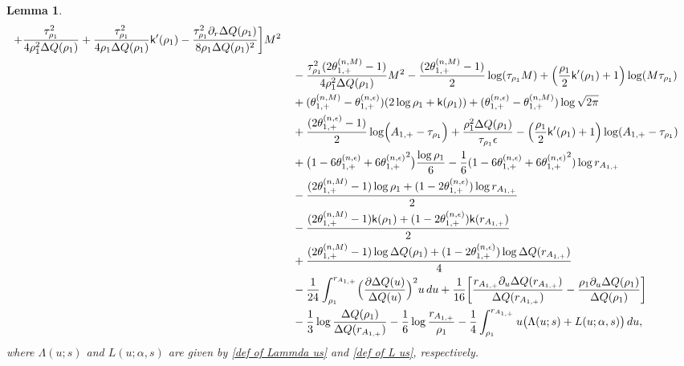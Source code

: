 \documentclass[a4paper]{article}
\newtheorem{lemma}[theorem]{Lemma}
\numberwithin{equation}{section}
\begin{document}
\begin{lemma}
\begin{align*}
+\frac{\tau_{\rho_1}^2}{4\rho_1^2\Delta Q(\rho_1)}
+\frac{\tau_{\rho_1}^2}{4\rho_1\Delta Q(\rho_1)}\mathsf{k}'(\rho_1)
-\frac{\tau_{\rho_1}^2\partial_r\Delta Q(\rho_1)}{8\rho_1\Delta Q(\rho_1)^2}
\bigg]M^2
\\
&\quad
-\frac{\tau_{\rho_1}^2(2\theta_{1,+}^{(n,M)}-1)}{4\rho_1^2\Delta Q(\rho_1)}M^2
-\frac{(2\theta_{1,+}^{(n,M)}-1)}{2}\log(\tau_{\rho_1}M)
+\Bigl(\frac{\rho_1}{2}\mathsf{k}'(\rho_1)+1\Bigr)\log (M\tau_{\rho_1})
\\
&\quad
+(\theta_{1,+}^{(n,M)}-\theta_{1,+}^{(n,\epsilon)})(2\log \rho_1+\mathsf{k}(\rho_1))
 +(\theta_{1,+}^{(n,\epsilon)}-\theta_{1,+}^{(n,M)})\log\sqrt{2\pi}
\\
&\quad
+\frac{(2\theta_{1,+}^{(n,\epsilon)}-1)}{2}\log\Bigl(A_{1,+}-\tau_{\rho_1}\Bigr)
+\frac{\rho_1^2\Delta Q(\rho_1)}{\tau_{\rho_1}\epsilon}
-\Bigl(\frac{\rho_1}{2}\mathsf{k}'(\rho_1)+1\Bigr)\log (A_{1,+}-\tau_{\rho_1})
 \\
&\quad
+\bigl(1-6\theta_{1,+}^{(n,\epsilon)}+6{\theta_{1,+}^{(n,\epsilon)}}^2\bigr)
\frac{\log \rho_1}{6}
-\frac{1}{6}(1-6\theta_{1,+}^{(n,\epsilon)}+6{\theta_{1,+}^{(n,\epsilon)}}^2)
\log r_{A_{1,+}}
\\
&\quad
-\frac{(2\theta_{1,+}^{(n,M)}-1)\log \rho_1+(1-2\theta_{1,+}^{(n,\epsilon)})\log r_{A_{1,+}}}{2}
\\
&\quad
-\frac{(2\theta_{1,+}^{(n,M)}-1)\mathsf{k}(\rho_1)+(1-2\theta_{1,+}^{(n,\epsilon)})\mathsf{k}(r_{A_{1,+}})}{2}
\\
&\quad
+\frac{(2\theta_{1,+}^{(n,M)}-1)\log\Delta Q(\rho_1)+(1-2\theta_{1,+}^{(n,\epsilon)})\log\Delta Q(r_{A_{1,+}})}{4}
\\
&\quad
-\frac{1}{24}\int_{\rho_1}^{r_{A_{1,+}}}\Bigl(\frac{\partial \Delta Q(u)}{\Delta Q(u)}\Bigr)^2u\,du
+\frac{1}{16}\bigg[
\frac{r_{A_{1,+}}\partial_u\Delta Q(r_{A_{1,+}})}{\Delta Q(r_{A_{1,+}})}-\frac{\rho_1\partial_u\Delta Q(\rho_1)}{\Delta Q(\rho_1)}
\bigg]\\
&\quad -\frac{1}{3}\log\frac{\Delta Q(\rho_1)}{\Delta Q(r_{A_{1,+}})}
-\frac{1}{6}\log\frac{r_{A_{1,+}}}{\rho_1}
-\frac{1}{4}\int_{\rho_1}^{r_{A_{1,+}}}u\bigl( \Lambda(u;s)+L(u;\alpha,s)\bigr)\,du,
\end{align*}
where $\Lambda(u;s)$ and $L(u;\alpha,s)$ are given by \eqref{def of Lammda us} and \eqref{def of L us}, respectively.
\end{lemma}
\end{document}
